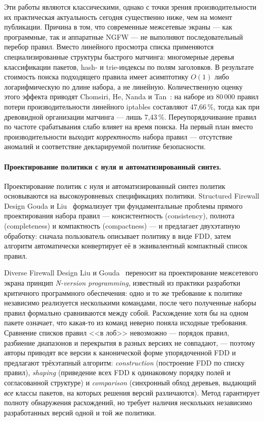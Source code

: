 Эти работы являются классическими, однако с точки зрения производительности их практическая актуальность сегодня существенно ниже, чем на момент публикации. Причина в том, что современные межсетевые экраны --- как программные, так и аппаратные NGFW --- не выполняют последовательный перебор правил. Вместо линейного просмотра списка применяются специализированные структуры быстрого матчинга: многомерные деревья классификации пакетов, hash- и trie-индексы по полям заголовков. В результате стоимость поиска подходящего правила имеет асимптотику $O(1)$ либо логарифмическую по длине набора, а не линейную. Количественную оценку этого эффекта приводят Chomsiri, He, Nanda и Tan~\cite{chomsiri2016hybrid}: на наборе из 80\,000 правил потери производительности линейного iptables составляют 47{,}66\,\%, тогда как при древовидной организации матчинга --- лишь 7{,}43\,\%. Переупорядочивание правил по частоте срабатывания слабо влияет на время поиска. На первый план вместо производительности выходит \emph{корректность} набора правил --- отсутствие аномалий и соответствие декларируемой политике безопасности.

\paragraph{Проектирование политики с нуля и автоматизированный синтез.} Проектирование политик с нуля и автоматизированный синтез политик основываются на высокоуровневых спецификациях политики. Structured Firewall Design Gouda и Liu~\cite{gouda2007structured} формализует три фундаментальные проблемы прямого проектирования набора правил --- консистентность (consistency), полнота (completeness) и компактность (compactness) --- и предлагает двухэтапную обработку: сначала пользователь описывает политику в виде FDD, затем алгоритм автоматически конвертирует её в эквивалентный компактный список правил.

Diverse Firewall Design Liu и Gouda~\cite{liu2008diverse} переносит на проектирование межсетевого экрана принцип \emph{N-version programming}, известный из практики разработки критичного программного обеспечения: одно и то же требование к политике независимо реализуется несколькими командами, после чего полученные наборы правил формально сравниваются между собой. Расхождение хотя бы на одном пакете означает, что какая-то из команд неверно поняла исходные требования. Сравнение списков правил <<в лоб>> невозможно --- порядок правил, разбиение диапазонов и перекрытия в разных версиях не совпадают, --- поэтому авторы приводят все версии к канонической форме упорядоченной FDD и предлагают трёхэтапный алгоритм: \emph{construction} (построение FDD по списку правил), \emph{shaping} (приведение всех FDD к одинаковому порядку полей и согласованной структуре) и \emph{comparison} (синхронный обход деревьев, выдающий \emph{все} классы пакетов, на которых решения версий различаются). Метод гарантирует полноту обнаружения расхождений, но требует наличия нескольких независимо разработанных версий одной и той же политики.

